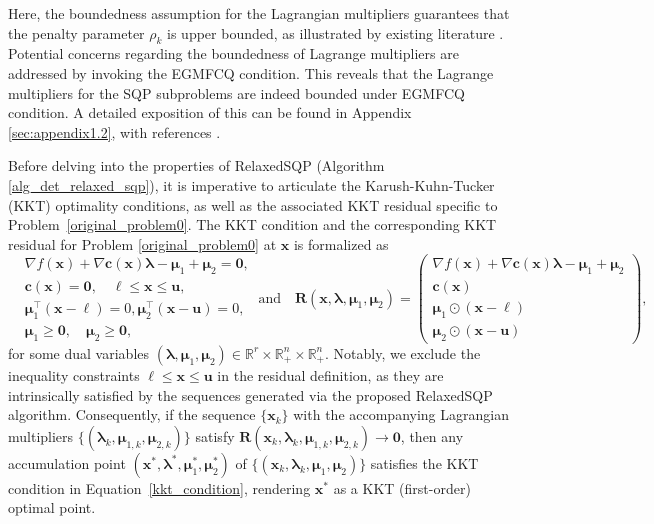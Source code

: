 \documentclass[aos]{imsart}
\numberwithin{equation}{section}
\theoremstyle{plain}
\begin{document}
Here, the boundedness assumption for the Lagrangian multipliers guarantees that the penalty parameter $\rho_k$ is upper bounded, as illustrated by existing literature \cite{burke1989robust, bertsekas1997nonlinear}. 
Potential concerns regarding the boundedness of Lagrange multipliers are addressed by invoking the EGMFCQ condition.  
This reveals that the Lagrange multipliers for the SQP subproblems are indeed bounded under EGMFCQ condition.
A detailed exposition of this can be found in Appendix \ref{sec:appendix1.2}, with references \cite{burke1989robust, gauvin1977necessary}.


Before delving into the properties of RelaxedSQP (Algorithm \ref{alg_det_relaxed_sqp}), 
it is imperative to articulate the Karush-Kuhn-Tucker (KKT) optimality conditions, as well as the associated KKT residual specific to Problem~\eqref{original_problem0}. 
    The KKT condition and  the corresponding KKT residual for Problem \eqref{original_problem0} at $\bm{x}$ is formalized as
    \begin{equation}
    \label{kkt_condition}
        \begin{split}
            & \nabla f (\bm{x}) + \nabla \bm{c}(\bm{x}) \bm{\lambda} - \bm{\mu}_1 + \bm{\mu}_2 = \bm{0},\\
            & \bm{c}(\bm{x}) = \bm{0},\quad \bm{\ell} \leq \bm{x} \leq \bm{u},\\
            & \bm{\mu}_1^{\top} (\bm{x} - \bm{\ell}) = 0,  \bm{\mu}_2^{\top} (\bm{x} - \bm{u}) = 0,\\
            & \bm{\mu}_1 \geq \bm{0}, \quad \bm{\mu}_2 \geq \bm{0},
        \end{split} ~\text{and} \quad
        \bm{R}(\bm{x},\bm{\lambda},\bm{\mu}_1,\bm{\mu}_2) = \left ( \begin{array}{c}
             \nabla f (\bm{x}) + \nabla \bm{c}(\bm{x}) \bm{\lambda} - \bm{\mu}_1 + \bm{\mu}_2  \\
            \bm{c}(\bm{x}) \\
            \bm{\mu}_1 \odot (\bm{x} - \bm{\ell})\\
            \bm{\mu}_2 \odot (\bm{x} - \bm{u})
        \end{array}\right),
    \end{equation}
    for some dual variables $(\bm{\lambda}, \bm{\mu}_1, \bm{\mu}_2) \in \mathbb{R}^{r} \times \mathbb{R}^{n}_{+} \times \mathbb{R}^{n}_{+}$. Notably, we exclude the inequality constraints $\bm{\ell} \leq \bm{x} \leq \bm{u}$ in the residual definition, as they are intrinsically satisfied by the sequences generated via the proposed RelaxedSQP algorithm.
    Consequently, if the sequence $\{\bm{x}_k\}$ with the accompanying Lagrangian multipliers $\{(\bm{\lambda}_k, \bm{\mu}_{1,k}, \bm{\mu}_{2,k})\}$ satisfy $\bm{R}(\bm{x}_k, \bm{\lambda}_k, \bm{\mu}_{1,k}, \bm{\mu}_{2,k}) \to \bm{0}$, then any accumulation point $(\bm{x}^{*},\bm{\lambda}^{*},\bm{\mu}_1^{*},\bm{\mu}_2^{*})$ of $\{(\bm{x}_k,\bm{\lambda}_k, \bm{\mu}_1, \bm{\mu}_2)\}$ satisfies the KKT condition in Equation~\eqref{kkt_condition}, rendering $\bm{x}^{*}$ as a KKT (first-order) optimal point.
\end{document}
